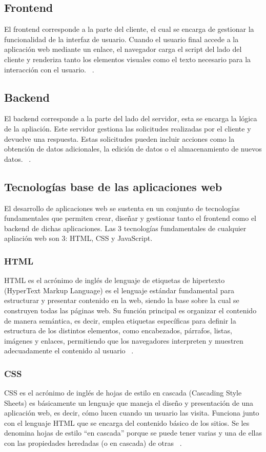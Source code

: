\subsection{Frontend}
El frontend corresponde a la parte del cliente, el cual se encarga de gestionar la funcionalidad de la interfaz de usuario. Cuando el usuario final accede a la aplicación web mediante un enlace, el navegador carga el script del lado del cliente y renderiza tanto los elementos visuales como el texto necesario para la interacción con el usuario. ~\cite{apliacionWebAmazon}.

\subsection{Backend}
El backend corresponde a la parte del lado del servidor, esta se encarga la lógica de la apliación. Este servidor gestiona las solicitudes realizadas por el cliente y devuelve una respuesta. Estas solicitudes pueden incluir acciones como la obtención de datos adicionales, la edición de datos o el almacenamiento de nuevos datos.  ~\cite{apliacionWebAmazon}.
 

\subsection{Tecnologías base de las aplicaciones web}
El desarrollo de aplicaciones web se sustenta en un conjunto de tecnologías fundamentales que permiten crear, diseñar y gestionar tanto el frontend como el backend de dichas aplicaciones. Las 3 tecnologías fundamentales de cualquier apliación web son 3: HTML, CSS y JavaScript.

\subsubsection{HTML}
HTML es el acrónimo de inglés de lenguaje de etiquetas de hipertexto (HyperText Markup Language) es el lenguaje estándar fundamental para estructurar y presentar contenido en la web, siendo la base sobre la cual se construyen todas las páginas web. Su función principal es organizar el contenido de manera semántica, es decir, emplea etiquetas específicas para definir la estructura de los distintos elementos, como encabezados, párrafos, listas, imágenes y enlaces, permitiendo que los navegadores interpreten y muestren adecuadamente el contenido al usuario ~\cite{HTMLMDN}.

\subsubsection{CSS}
CSS es el acrónimo de inglés de hojas de estilo en cascada (Cascading Style Sheets) es básicamente un lenguaje que maneja el diseño y presentación de una aplicación web, es decir, cómo lucen cuando un usuario las visita. Funciona junto con el lenguaje HTML que se encarga del contenido básico de los sitios. Se les denomina hojas de estilo “en cascada” porque se puede tener varias y una de ellas con las propiedades heredadas (o en cascada) de otras ~\cite{CSSMDN}.  

